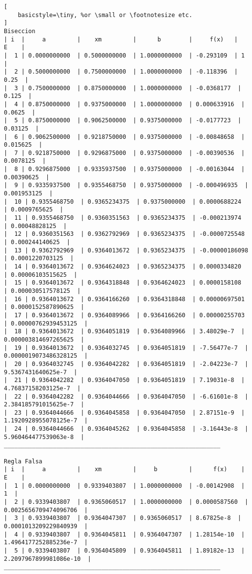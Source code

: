 \documentclass{article}
\begin{document}
\begin{lstlisting}[
    basicstyle=\tiny, %or \small or \footnotesize etc.
]
Biseccion
| i  |     a         |    xm         |      b        |     f(x)   |    E    |
|  1 | 0.0000000000  | 0.5000000000  | 1.0000000000  | -0.293109  | 1  |
|  2 | 0.5000000000  | 0.7500000000  | 1.0000000000  | -0.118396  | 0.25  |
|  3 | 0.7500000000  | 0.8750000000  | 1.0000000000  | -0.0368177  | 0.125  |
|  4 | 0.8750000000  | 0.9375000000  | 1.0000000000  | 0.000633916  | 0.0625  |
|  5 | 0.8750000000  | 0.9062500000  | 0.9375000000  | -0.0177723  | 0.03125  |
|  6 | 0.9062500000  | 0.9218750000  | 0.9375000000  | -0.00848658  | 0.015625  |
|  7 | 0.9218750000  | 0.9296875000  | 0.9375000000  | -0.00390536  | 0.0078125  |
|  8 | 0.9296875000  | 0.9335937500  | 0.9375000000  | -0.00163044  | 0.00390625  |
|  9 | 0.9335937500  | 0.9355468750  | 0.9375000000  | -0.000496935  | 0.001953125  |
|  10 | 0.9355468750  | 0.9365234375  | 0.9375000000  | 0.0000688224  | 0.0009765625  |
|  11 | 0.9355468750  | 0.9360351563  | 0.9365234375  | -0.000213974  | 0.00048828125  |
|  12 | 0.9360351563  | 0.9362792969  | 0.9365234375  | -0.0000725548  | 0.000244140625  |
|  13 | 0.9362792969  | 0.9364013672  | 0.9365234375  | -0.00000186098  | 0.0001220703125  |
|  14 | 0.9364013672  | 0.9364624023  | 0.9365234375  | 0.0000334820  | 0.00006103515625  |
|  15 | 0.9364013672  | 0.9364318848  | 0.9364624023  | 0.0000158108  | 0.000030517578125  |
|  16 | 0.9364013672  | 0.9364166260  | 0.9364318848  | 0.00000697501  | 0.0000152587890625  |
|  17 | 0.9364013672  | 0.9364089966  | 0.9364166260  | 0.00000255703  | 0.00000762939453125  |
|  18 | 0.9364013672  | 0.9364051819  | 0.9364089966  | 3.48029e-7  | 0.000003814697265625  |
|  19 | 0.9364013672  | 0.9364032745  | 0.9364051819  | -7.56477e-7  | 0.0000019073486328125  |
|  20 | 0.9364032745  | 0.9364042282  | 0.9364051819  | -2.04223e-7  | 9.5367431640625e-7  |
|  21 | 0.9364042282  | 0.9364047050  | 0.9364051819  | 7.19031e-8  | 4.76837158203125e-7  |
|  22 | 0.9364042282  | 0.9364044666  | 0.9364047050  | -6.61601e-8  | 2.384185791015625e-7  |
|  23 | 0.9364044666  | 0.9364045858  | 0.9364047050  | 2.87151e-9  | 1.1920928955078125e-7  |
|  24 | 0.9364044666  | 0.9364045262  | 0.9364045858  | -3.16443e-8  | 5.960464477539063e-8  |
______________________________________________________________

Regla Falsa
| i  |     a         |    xm         |     b         |      f(x)    |    E    |
|  1 | 0.0000000000  | 0.9339403807  | 1.0000000000  | -0.00142908  | 1  |
|  2 | 0.9339403807  | 0.9365060517  | 1.0000000000  | 0.0000587560  | 0.0025656709474096706  |
|  3 | 0.9339403807  | 0.9364047307  | 0.9365060517  | 8.67825e-8  | 0.0001013209229840939  |
|  4 | 0.9339403807  | 0.9364045811  | 0.9364047307  | 1.28154e-10  | 1.4964177252885236e-7  |
|  5 | 0.9339403807  | 0.9364045809  | 0.9364045811  | 1.89182e-13  | 2.2097967899981086e-10  |
______________________________________________________________


\end{lstlisting}
\end{document}
